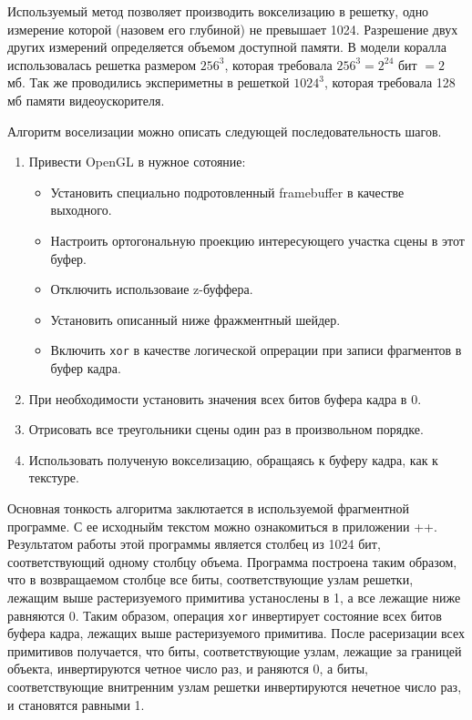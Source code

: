 \documentclass[a4paper,14pt]{extreport}
\begin{document}
Используемый метод позволяет производить вокселизацию в решетку, одно измерение которой (назовем его глубиной) не превышает 1024. Разрешение двух других измерений определяется объемом доступной памяти. В модели коралла использовалась решетка размером $256^3$, которая требовала $256^3 = 2^{24}$ бит $ = 2$ мб. Так же проводились экспериметны в решеткой $1024^3$, которая требовала 128 мб памяти видеоускорителя.

Алгоритм воселизации можно описать следующей последовательность шагов.

\begin{enumerate}
\item Привести OpenGL в нужное сотояние:
\begin{itemize}
\item Установить специально подротовленный framebuffer в качестве выходного.
\item Настроить ортогональную проекцию интересующего участка сцены в этот буфер.
\item Отключить использоваие z-буффера.
\item Установить описанный ниже фражментный шейдер.
\item Включить \texttt{xor} в качестве логической опрерации при записи фрагментов в буфер кадра.
\end{itemize}
\item При необходимости установить значения всех битов буфера кадра в 0.
\item Отрисовать все треугольники сцены один раз в произвольном порядке.
\item Использовать полученую вокселизацию, обращаясь к буферу кадра, как к текстуре.
\end{enumerate}

Основная тонкость алгоритма заклютается в используемой фрагментной программе. С ее исходныйм текстом можно ознакомиться в приложении ++. Результатом работы этой программы является столбец из 1024 бит, соответствующий одному столбцу объема. Программа построена таким образом, что в возвращаемом столбце все биты, соответствующие узлам решетки, лежащим выше растеризуемого примитива устанослены в 1, а все лежащие ниже равняются 0. Таким образом, операция \texttt{xor} инвертирует состояние всех битов буфера кадра, лежащих выше растеризуемого примитива. После расеризации всех примитивов получается, что биты, соответствующие узлам, лежащие за границей объекта, инвертируются четное число раз, и раняются 0, а биты, соответствующие внитренним узлам решетки инвертируются нечетное число раз, и становятся равными 1.
\end{document}
